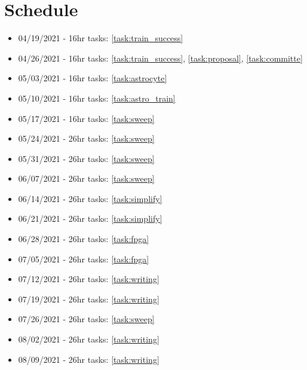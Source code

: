 \section{Schedule}
\begin{itemize}
    \item 04/19/2021 - 16hr tasks: \ref{task:train_success}
    \item 04/26/2021 - 16hr tasks: \ref{task:train_success}, \ref{task:proposal}, \ref{task:committe}
    \item 05/03/2021 - 16hr tasks: \ref{task:astrocyte}
    \item 05/10/2021 - 16hr tasks: \ref{task:astro_train}
    \item 05/17/2021 - 16hr tasks: \ref{task:sweep}
    \item 05/24/2021 - 26hr tasks: \ref{task:sweep}
    \item 05/31/2021 - 26hr tasks: \ref{task:sweep}
    \item 06/07/2021 - 26hr tasks: \ref{task:sweep}
    \item 06/14/2021 - 26hr tasks: \ref{task:simplify}
    \item 06/21/2021 - 26hr tasks: \ref{task:simplify}
    \item 06/28/2021 - 26hr tasks: \ref{task:fpga}
    \item 07/05/2021 - 26hr tasks: \ref{task:fpga}
    \item 07/12/2021 - 26hr tasks: \ref{task:writing}
    \item 07/19/2021 - 26hr tasks: \ref{task:writing}
    \item 07/26/2021 - 26hr tasks: \ref{task:sweep}
    \item 08/02/2021 - 26hr tasks: \ref{task:writing}
    \item 08/09/2021 - 26hr tasks: \ref{task:writing}
\end{itemize}


